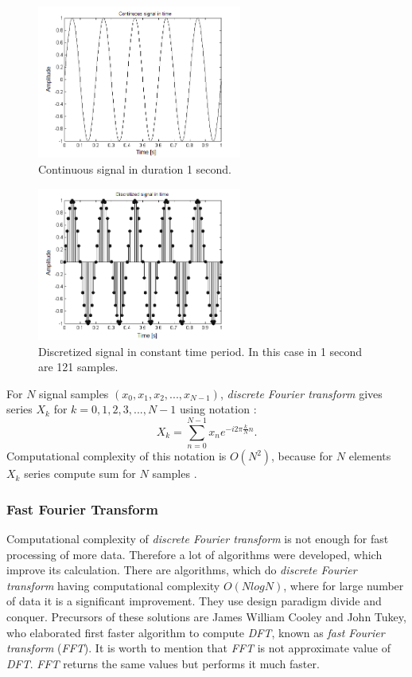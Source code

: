 \documentclass[11pt,titlepage]{article}
\theoremstyle{plain}
\begin{document}
\begin{figure}[H]
	\centering
	\includegraphics[width=0.6\textwidth]{img/continues}
	\caption{Continuous signal in duration 1 second.}
	\label{fig:F6}
\end{figure}

\begin{figure}[H]
	\centering
	\includegraphics[width=0.6\textwidth]{img/descrete}
	\caption{Discretized signal in constant time period. In this case in 1 second are 121 samples.}
	\label{fig:F7}
\end{figure}

For $N$ signal samples $(x_0,x_1,x_2,...,x_{N-1})$, \textit{discrete Fourier transform} gives series $X_k$ for $k = 0,1, 2, 3, ..., N-1$ using notation \cite{fourier}:
\begin{equation}
	X_k =  \sum\limits_{n=0}^{N-1} x_ne^{-i2\pi \frac{k}{N}n}.
\end{equation}
Computational complexity of this notation is $O(N^2)$, because for $N$ elements $X_k$ series compute sum for $N$ samples \cite{fast_fourier}.

\subsubsection{Fast Fourier Transform}
Computational complexity of \textit{discrete Fourier transform} is not enough for fast processing of more data. Therefore a lot of algorithms were developed, which improve its calculation. There are algorithms, which do \textit{discrete Fourier transform} having computational complexity $O(NlogN)$, where for large number of data it is a significant improvement. They use design paradigm divide and conquer. Precursors of these solutions are James William Cooley and John Tukey, who elaborated first faster algorithm to compute \textit{DFT}, known as \textit{fast Fourier transform} (\textit{FFT}). It is worth to mention that \textit{FFT} is not approximate value of \textit{DFT}. \textit{FFT} returns the same values but performs it much faster.
\end{document}
